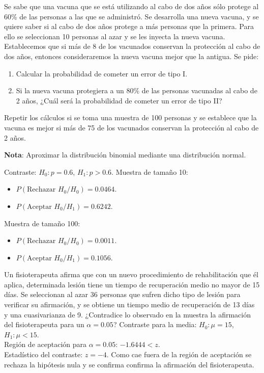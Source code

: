 
{Se sabe que una vacuna que se está utilizando al cabo de dos años sólo protege al 60\% de las personas a las que se
administró.
Se desarrolla una nueva vacuna, y se quiere saber si al cabo de dos años protege a más personas que la primera.
Para ello se seleccionan 10 personas al azar y se les inyecta la nueva vacuna.
Establecemos que si más de 8 de los vacunados conservan la protección al cabo de dos años, entonces consideraremos la
nueva vacuna mejor que la antigua.
Se pide:
\begin{enumerate}
\item Calcular la probabilidad de cometer un error de tipo I.
\item Si la nueva vacuna protegiera a un 80\% de las personas vacunadas al cabo de 2 años, ¿Cuál será la probabilidad
de cometer un error de tipo II?
\end{enumerate}

Repetir los cálculos si se toma una muestra de 100 personas y se establece que la vacuna es mejor si más de 75 de los
vacunados conservan la protección al cabo de 2 años.

\noindent \textbf{Nota}: Aproximar la distribución binomial mediante una distribución normal.
}
{
Contraste: $H_0:p=0.6$, $H_1:p>0.6$. Muestra de tamaño 10:
\begin{itemize}
\item $P(\text{Rechazar }H_0/H_0)=0.0464$.
\item $P(\text{Aceptar }H_0/H_1)= 0.6242$.
\end{itemize}
Muestra de tamaño 100:
\begin{itemize}
\item $P(\text{Rechazar }H_0/H_0)=0.0011$.
\item $P(\text{Aceptar }H_0/H_1)=0.1056$.
\end{itemize}
}
{}


{Un fisioterapeuta afirma que con un nuevo procedimiento de rehabilitación que él aplica, determinada lesión tiene un
tiempo de recuperación medio no mayor de 15 días.
Se seleccionan al azar 36 personas que sufren dicho tipo de lesión para verificar su afirmación, y se obtiene un tiempo
medio de recuperación de 13 días y una cuasivarianza de 9.
¿Contradice lo observado en la muestra la afirmación del fisioterapeuta para un $\alpha =0.05$? }
{
Contraste para la media: $H_0:\mu=15$, $H_1:\mu<15$.\\
Región de aceptación para $\alpha=0.05$: $-1.6444<z$.\\
Estadístico del contraste: $z=-4$. Como cae fuera de la región de aceptación se rechaza la hipótesis nula y se
confirma confirma la afirmación del fisioterapeuta.
}
{}


